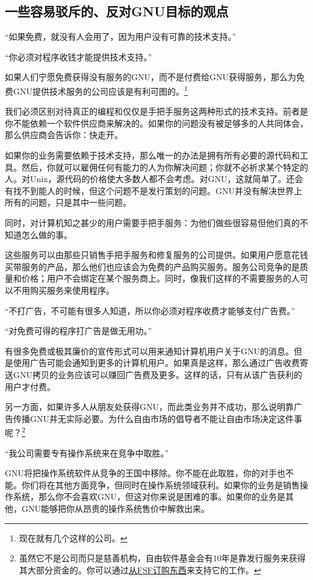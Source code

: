 \subsection{一些容易驳斥的、反对GNU目标的观点}
“如果免费，就没有人会用了，因为用户没有可靠的技术支持。”\par
“你必须对程序收钱才能提供技术支持。”\par
如果人们宁愿免费获得没有服务的GNU，而不是付费给GNU获得服务，那么为免费GNU提供技术服务的公司应该是有利可图的。\footnote{现在就有几个这样的公司。}\par
我们必须区别对待真正的编程和仅仅是手把手服务这两种形式的技术支持。前者是你不能依赖一个软件供应商来解决的。如果你的问题没有被足够多的人共同体会，那么供应商会告诉你：快走开。\par
如果你的业务需要依赖于技术支持，那么唯一的办法是拥有所有必要的源代码和工具。然后，你就可以雇佣任何有能力的人为你解决问题；你就不必祈求某个特定的人。对Unix，源代码的价格使大多数人都不会考虑。对GNU，这就简单了。还会有找不到能人的时候，但这个问题不是发行策划的问题。GNU并没有解决世界上所有的问题，只是其中一些问题。\par
同时，对计算机知之甚少的用户需要手把手服务：为他们做些很容易但他们真的不知道怎么做的事。\par
这些服务可以由那些只销售手把手服务和修复服务的公司提供。如果用户愿意花钱买带服务的产品，那么他们也应该会为免费的产品购买服务。服务公司竞争的是质量和价格；用户不会绑定在某个服务商上。同时，像我们这样的不需要服务的人可以不用购买服务来使用程序。\par
“不打广告，不可能有很多人知道，所以你必须对程序收费才能够支付广告费。”\par
“对免费可得的程序打广告是做无用功。”\par
有很多免费或极其廉价的宣传形式可以用来通知计算机用户关于GNU的消息。但是使用广告可能会通知到更多的计算机用户。如果真是这样，那么通过广告收费寄送GNU拷贝的业务应该可以赚回广告费及更多。这样的话，只有从该广告获利的用户才付费。\par
另一方面，如果许多人从朋友处获得GNU，而此类业务并不成功，那么说明靠广告传播GNU并无实际必要。为什么自由市场的倡导者不能让自由市场决定这件事呢？\footnote{虽然它不是公司而只是慈善机构，自由软件基金会有10年是靠发行服务来获得其大部分资金的。你可以通过\href{http://www.gnu.org/order/order.html}{从FSF订购东西}来支持它的工作。 }\par
“我公司需要专有操作系统来在竞争中取胜。”\par
GNU将把操作系统软件从竞争的王国中移除。你不能在此取胜，你的对手也不能。你们将在其他方面竞争，但同时在操作系统领域获利。如果你的业务是销售操作系统，那么你不会喜欢GNU，但这对你来说是困难的事。如果你的业务是其他，GNU能够把你从昂贵的操作系统售价中解救出来。\par
